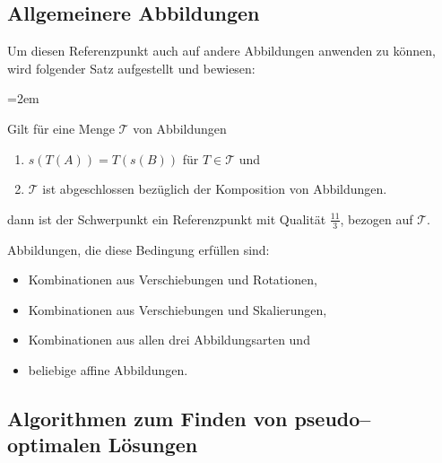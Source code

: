\subsection{Allgemeinere Abbildungen}

Um diesen Referenzpunkt auch auf andere Abbildungen anwenden zu können, wird folgender Satz aufgestellt und bewiesen:

\par
\begingroup
\leftskip=2em %

Gilt für eine Menge $\mathcal{T}$  von Abbildungen 
\begin{enumerate}
\item $s(T(A))=T(s(B))$ für $T\in\mathcal{T}$ und 
\item $\mathcal{T}$ ist abgeschlossen bezüglich der Komposition von Abbildungen.
\end{enumerate}
dann ist der Schwerpunkt ein  Referenzpunkt mit Qualität $\frac{11}{3}$, bezogen auf $\mathcal{T}$.
\par
\endgroup
Abbildungen, die diese Bedingung erfüllen sind: 
\begin{itemize}
\item Kombinationen aus Verschiebungen und Rotationen,
\item Kombinationen aus Verschiebungen und Skalierungen,
\item Kombinationen aus allen drei Abbildungsarten und
\item beliebige affine Abbildungen.
\end{itemize}

\subsection{Algorithmen zum Finden von pseudo--optimalen Lösungen}


